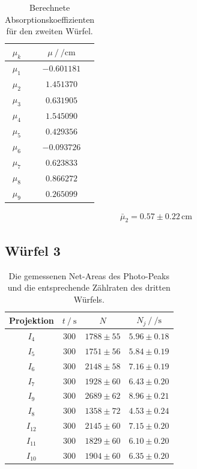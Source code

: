 \begin{table}[H]
  \centering
  \begin{tabular}{c c}
    \toprule
     $\mu_k$ &  $\mu \:/\: \si{\per\centi\metre}$ \\
    \midrule
            $\mu_{  1}$ &   $-0.601181$ \\
            $\mu_{  2}$ &   $ 1.451370$ \\
            $\mu_{  3}$ &   $ 0.631905$ \\
            $\mu_{  4}$ &   $ 1.545090$ \\
            $\mu_{  5}$ &   $ 0.429356$ \\
            $\mu_{  6}$ &   $-0.093726$ \\
             $\mu_{ 7}$ &   $ 0.623833$ \\
             $\mu_{ 8}$ &   $ 0.866272$ \\
             $\mu_{ 9}$ &   $ 0.265099$ \\
    \bottomrule
    \end{tabular}
  \caption{Berechnete Absorptionskoeffizienten für den zweiten Würfel. }
  \label{tab:w2_mu}
\end{table}


\begin{align}
  \bar{\mu}_2 = 0.57\pm 0.22 \,\si{\centi\metre}
\end{align}
\subsection{Würfel 3}

\begin{table}[H]
  \centering
  \begin{tabular}{c c c c}
    \toprule
    Projektion &  $t \:/\: \si{\second}$ &     $N$ &           $N_j \:/\: \si{\per\second}$ \\
    \midrule
             $I_{ 4}$ &   $300$ & $1788 \pm   55$ & $5.96\pm0.18$ \\
             $I_{ 5}$ &   $300$ & $1751 \pm   56$ & $5.84\pm0.19$ \\
             $I_{ 6}$ &   $300$ & $2148 \pm   58$ & $7.16\pm0.19$ \\
             $I_{ 7}$ &   $300$ & $1928 \pm   60$ & $6.43\pm0.20$ \\
             $I_{ 9}$ &   $300$ & $2689 \pm   62$ & $8.96\pm0.21$ \\
             $I_{ 8}$ &   $300$ & $1358 \pm   72$ & $4.53\pm0.24$ \\
             $I_{12}$ &   $300$ & $2145 \pm   60$ & $7.15\pm0.20$ \\
             $I_{11}$ &   $300$ & $1829 \pm   60$ & $6.10\pm0.20$ \\
             $I_{10}$ &   $300$ & $1904 \pm   60$ & $6.35\pm0.20$ \\
    \bottomrule
  \end{tabular}
  \caption{Die gemessenen Net-Areas des Photo-Peaks und die entsprechende Zählraten des dritten Würfels. }
  \label{tab:w3}
\end{table}


